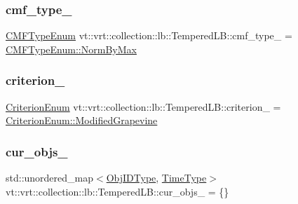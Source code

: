 \subsubsection{\texorpdfstring{cmf\+\_\+type\+\_\+}{cmf\_type\_}}
{\footnotesize\ttfamily \hyperlink{namespacevt_1_1vrt_1_1collection_1_1lb_ada1e381e6b19ba9f8277d4f698445404}{C\+M\+F\+Type\+Enum} vt\+::vrt\+::collection\+::lb\+::\+Tempered\+L\+B\+::cmf\+\_\+type\+\_\+ = \hyperlink{namespacevt_1_1vrt_1_1collection_1_1lb_ada1e381e6b19ba9f8277d4f698445404a2a17cd13e37fb3cacfea703c5edc3680}{C\+M\+F\+Type\+Enum\+::\+Norm\+By\+Max}\hspace{0.3cm}{\ttfamily [private]}}

\mbox{\label{structvt_1_1vrt_1_1collection_1_1lb_1_1_tempered_l_b_a808bb3c7d3bdf1ecfc8fe8cb24848047}} 
\subsubsection{\texorpdfstring{criterion\+\_\+}{criterion\_}}
{\footnotesize\ttfamily \hyperlink{namespacevt_1_1vrt_1_1collection_1_1lb_a4e454750e102cf5404d5ac151148951c}{Criterion\+Enum} vt\+::vrt\+::collection\+::lb\+::\+Tempered\+L\+B\+::criterion\+\_\+ = \hyperlink{namespacevt_1_1vrt_1_1collection_1_1lb_a4e454750e102cf5404d5ac151148951caf2d66de88187d7c4c75884f5605ae168}{Criterion\+Enum\+::\+Modified\+Grapevine}\hspace{0.3cm}{\ttfamily [private]}}

\mbox{\label{structvt_1_1vrt_1_1collection_1_1lb_1_1_tempered_l_b_a77a4746596cd288e0833a95b2e47a8ef}} 
\subsubsection{\texorpdfstring{cur\+\_\+objs\+\_\+}{cur\_objs\_}}
{\footnotesize\ttfamily std\+::unordered\+\_\+map$<$\hyperlink{structvt_1_1vrt_1_1collection_1_1lb_1_1_base_l_b_a790b22acf448880599724749cdc4e9b3}{Obj\+I\+D\+Type}, \hyperlink{namespacevt_a876a9d0cd5a952859c72de8a46881442}{Time\+Type}$>$ vt\+::vrt\+::collection\+::lb\+::\+Tempered\+L\+B\+::cur\+\_\+objs\+\_\+ = \{\}\hspace{0.3cm}{\ttfamily [private]}}

